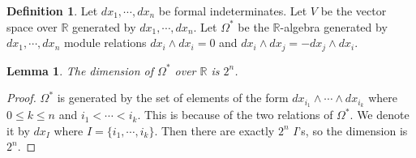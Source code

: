 \documentclass[psamsfonts]{amsart}
\newtheorem{lem}[thm]{Lemma}
\theoremstyle{definition}
\newtheorem{defn}[thm]{Definition}
\theoremstyle{rem}
\numberwithin{equation}{section}
\begin{document}
\begin{defn}
  Let $dx_1, \cdots, dx_n$ be formal indeterminates.
  Let $V$ be the vector space over $\mathbb{R}$ generated by $dx_1, \cdots, dx_n$.
  Let $\Omega^{\ast}$ be the $\mathbb{R}$-algebra generated by $dx_1, \cdots, dx_n$ module relations $dx_i \wedge dx_i = 0$ and $dx_i \wedge dx_j = - dx_j \wedge dx_i$.
\end{defn}

\begin{lem}
  The dimension of $\Omega^{\ast}$ over $\mathbb{R}$ is $2^n$.
\end{lem}

\begin{proof}
  $\Omega^{\ast}$ is generated by the set of elements of the form $dx_{i_1} \wedge \cdots \wedge dx_{i_k}$ where $0 \leq k \leq n$ and $i_1 < \cdots < i_k$.
  This is because of the two relations of $\Omega^{\ast}$.
  We denote it by $dx_{I}$ where $I = \{ i_1, \cdots, i_k \}$.
  Then there are exactly $2^n$ $I$'s, so the dimension is $2^n$.
\end{proof}
\end{document}
